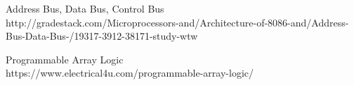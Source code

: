 \newpage
{}
    \begin{thebibliography}{2}

         Address Bus, Data Bus, Control Bus\\
        http://gradestack.com/Microprocessors-and/Architecture-of-8086-and/Address-Bus-Data-Bus-/19317-3912-38171-study-wtw

         Programmable Array Logic\\
        https://www.electrical4u.com/programmable-array-logic/

    \end{thebibliography}
